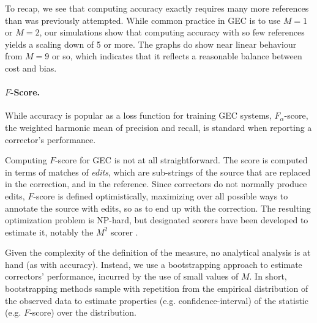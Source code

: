 \documentclass[letter,11pt]{article}
\begin{document}
		To recap, we see that computing accuracy exactly requires many more references than was previously attempted.
		While common practice in GEC is to use $M=1$ or $M=2$, our simulations show that computing accuracy with
		so few references yields a scaling down of 5 or more. The graphs do show near linear behaviour from $M=9$ or
		so, which indicates that it reflects a reasonable balance between cost and bias.
		
		\paragraph{$F$-Score.}
		While accuracy is popular as a loss function for training GEC systems,
		$F_\alpha$-score, the weighted harmonic mean of precision and recall, is standard when reporting a corrector's performance.
		
		Computing $F$-score for GEC is not at all straightforward. The score is computed
		in terms of matches of {\it edits}, which are sub-strings of the source
		that are replaced in the correction, and in the reference. Since correctors
		do not normally produce edits, $F$-score is defined optimistically, maximizing
		over all possible ways to annotate the source with edits, so as to end up with the correction. 
		The resulting optimization problem is NP-hard, but designated scorers
		have been developed to estimate it, notably the $M^2$ scorer
		\cite{dahlmeier2012better}.
		
		Given the complexity of the definition of the measure, no analytical analysis is at hand (as with accuracy). Instead, we use a bootstrapping
		approach to estimate correctors' performance,
		incurred by the use of small values of $M$.
		In short, bootstrapping methods sample with repetition from the empirical distribution of the observed data to estimate properties (e.g. confidence-interval) of the statistic (e.g. $F$-score) over the distribution. 
		
\end{document}
